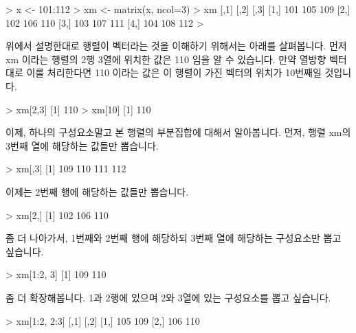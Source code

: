 \begin{Schunk}
\begin{Soutput}
> x <- 101:112
> xm <- matrix(x, ncol=3)
> xm
     [,1] [,2] [,3]
[1,]  101  105  109
[2,]  102  106  110
[3,]  103  107  111
[4,]  104  108  112
> 
\end{Soutput}
\end{Schunk}

위에서 설명한대로 행렬이 벡터라는 것을 이해하기 위해서는 아래를 살펴봅니다. 
먼저 xm 이라는 행렬의 2행 3열에 위치한 값은 110 임을 알 수 있습니다. 
만약 열방향 벡터대로 이를 처리한다면 110 이라는 값은 이 행렬이 가진 벡터의 위치가 10번째일 것입니다.

\begin{Schunk}
\begin{Soutput}
> xm[2,3]
[1] 110
> xm[10]
[1] 110
\end{Soutput}
\end{Schunk}

이제, 하나의 구성요소말고 본 행렬의 부분집합에 대해서 알아봅니다. 
먼저, 행렬 xm의 3번째 열에 해당하는 값들만 뽑습니다. 

\begin{Schunk}
\begin{Soutput}
> xm[,3]
[1] 109 110 111 112
\end{Soutput}
\end{Schunk}

이제는 2번째 행에 해당하는 값들만 뽑습니다. 

\begin{Schunk}
\begin{Soutput}
> xm[2,]
[1] 102 106 110
\end{Soutput}
\end{Schunk}

좀 더 나아가서, 1번째와 2번째 행에 해당하되 3번째 열에 해당하는 구성요소만 뽑고 싶습니다. 
\begin{Schunk}
\begin{Soutput}
> xm[1:2, 3]
[1] 109 110
\end{Soutput}
\end{Schunk}

좀 더 확장해봅니다. 1과 2행에 있으며 2와 3열에 있는 구성요소를 뽑고 싶습니다.

\begin{Schunk}
\begin{Soutput}
> xm[1:2, 2:3]
     [,1] [,2]
[1,]  105  109
[2,]  106  110
\end{Soutput}
\end{Schunk}

